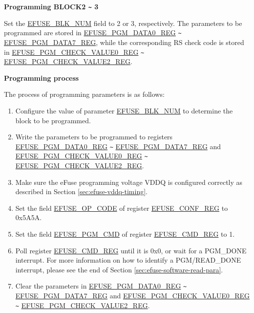 \documentclass[main\_\_EN.tex]{subfiles}
\begin{document}
{\bfseries Programming BLOCK2 \verb+~+ 3}

Set the \hyperref[fielddesc:EFUSEBLKNUM]{EFUSE\_BLK\_NUM} field to 2 or 3, respectively. The parameters to be programmed are stored in \hyperref[regdesc:EFUSEPGMDATA0REG]{EFUSE\_PGM\_DATA0\_REG} \verb+~+ \hyperref[regdesc:EFUSEPGMDATA7REG]{EFUSE\_PGM\_DATA7\_REG}, while the corresponding RS check code is stored in \hyperref[regdesc:EFUSEPGMCHECKVALUE0REG]{EFUSE\_PGM\_CHECK\_VALUE0\_REG}  \verb+~+ \hyperref[regdesc:EFUSEPGMCHECKVALUE2REG]{EFUSE\_PGM\_CHECK\_VALUE2\_REG}.

{\bfseries Programming process}

The process of programming parameters is as follows:

\begin{enumerate}
\item Configure the value of parameter \hyperref[fielddesc:EFUSEBLKNUM]{EFUSE\_BLK\_NUM} to determine the block to be programmed.

\item Write the parameters to be programmed to registers \hyperref[regdesc:EFUSEPGMDATA0REG]{EFUSE\_PGM\_DATA0\_REG} \verb+~+ \hyperref[regdesc:EFUSEPGMDATA7REG]{EFUSE\_PGM\_DATA7\_REG} and \hyperref[regdesc:EFUSEPGMCHECKVALUE0REG]{EFUSE\_PGM\_CHECK\_VALUE0\_REG}  \verb+~+  \hyperref[regdesc:EFUSEPGMCHECKVALUE2REG]{EFUSE\_PGM\_CHECK\_VALUE2\_REG}.


\item Make sure the eFuse programming voltage VDDQ is configured correctly as described in Section \ref{sec:efuse-vddq-timing}.

\item Set the field \hyperref[fielddesc:EFUSEOPCODE]{EFUSE\_OP\_CODE} of register \hyperref[regdesc:EFUSECONFREG]{EFUSE\_CONF\_REG} to 0x5A5A.

\item Set the field \hyperref[fielddesc:EFUSEPGMCMD]{EFUSE\_PGM\_CMD} of register \hyperref[regdesc:EFUSECMDREG]{EFUSE\_CMD\_REG} to 1.

\item Poll register \hyperref[regdesc:EFUSECMDREG]{EFUSE\_CMD\_REG} until it is 0x0, or wait for a PGM\_DONE interrupt. For more information on how to identify a PGM/READ\_DONE interrupt, please see the end of Section \ref{sec:efuse-software-read-para}.

\item Clear the parameters in \hyperref[regdesc:EFUSEPGMDATA0REG]{EFUSE\_PGM\_DATA0\_REG} \verb+~+ \hyperref[regdesc:EFUSEPGMDATA7REG]{EFUSE\_PGM\_DATA7\_REG} and \hyperref[regdesc:EFUSEPGMCHECKVALUE0REG]{EFUSE\_PGM\_CHECK\_VALUE0\_REG}  \verb+~+  \hyperref[regdesc:EFUSEPGMCHECKVALUE2REG]{EFUSE\_PGM\_CHECK\_VALUE2\_REG}.


\end{enumerate}
\end{document}
